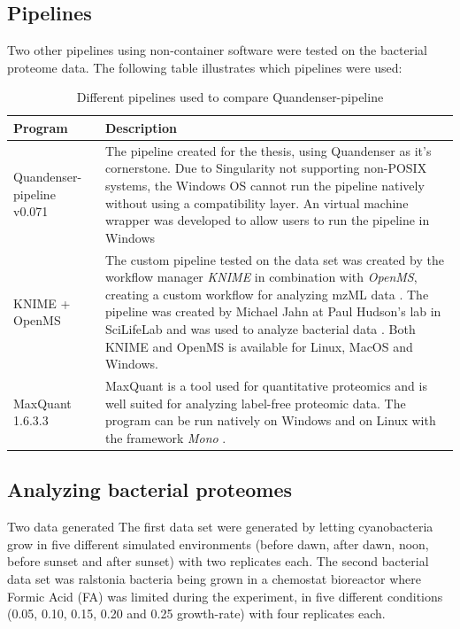 \subsection{Pipelines}

Two other pipelines using non-container software were tested on the bacterial proteome data. The following table illustrates which pipelines were used:

\newcommand{\textone}{\small The pipeline created for the thesis, using Quandenser as it's cornerstone. Due to Singularity not supporting non-POSIX systems, the Windows OS cannot run the pipeline natively without using a compatibility layer. An virtual machine wrapper was developed to allow users to run the pipeline in Windows}
\newcommand{\texttwo}{\small The custom pipeline tested on the data set was created by the workflow manager \textit{KNIME} in combination with \textit{OpenMS}, creating a custom workflow for analyzing mzML data \cite{knime} \cite{openms}. The pipeline was created by Michael Jahn at Paul Hudson's lab in SciLifeLab and was used to analyze bacterial data \cite{m-jahn-pipeline}. Both KNIME and OpenMS is available for Linux, MacOS and Windows.}
\newcommand{\textthree}{\small MaxQuant is a tool used for quantitative proteomics and is well suited for analyzing label-free proteomic data. The program can be run natively on Windows and on Linux with the framework \textit{Mono} \cite{maxquant} \cite{maxquant-installation}.}

\begin{table}[H]
\caption{Different pipelines used to compare Quandenser-pipeline}
\begin{center}
\begin{tabular}{|p{4cm}|p{9cm}|}
\hline
Program & Description \\ \hline \hline
Quandenser-pipeline v0.071 & \textone \\ \hline
KNIME + OpenMS & \texttwo \\ \hline
MaxQuant 1.6.3.3 & \textthree \\ \hline
\end{tabular}
\end{center}
\end{table}

\subsection{Analyzing bacterial proteomes}
Two data generated The first data set were generated by letting cyanobacteria grow in five different simulated environments (before dawn, after dawn, noon, before sunset and after sunset) with two replicates each. The second bacterial data set was ralstonia bacteria being grown in a chemostat bioreactor where Formic Acid (FA) was limited during the experiment, in five different conditions (0.05, 0.10, 0.15, 0.20 and 0.25 growth-rate) with four replicates each.

